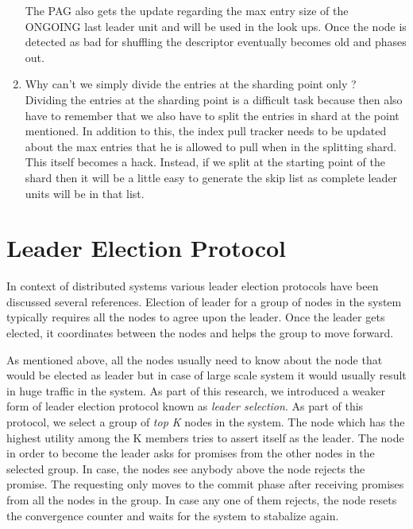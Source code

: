 \documentclass[a4paper, 11pt]{article}
\begin{document}
\begin{enumerate}
The PAG also gets the update regarding the max entry size of the ONGOING last leader unit and will be used in the look ups. Once the node is detected as bad for shuffling the descriptor eventually becomes old and phases out.


\item Why can't we simply divide the entries at the sharding point only ? \\
Dividing the entries at the sharding point is a difficult task because then also have to remember that we also have to split the entries in shard at the point mentioned. In addition to this, the index pull tracker needs to be updated about the max entries that he is allowed to pull when in the splitting shard. This itself becomes a hack. Instead, if we split at the starting point of the shard then it will be a little easy to generate the skip list as complete leader units will be in that list. 


\end{enumerate}

\newpage
\section{Leader Election Protocol}

In context of distributed systems various leader election protocols have been discussed {several references}. Election of leader for a group of nodes in the system typically requires all the nodes to agree upon the leader. Once the leader gets elected, it coordinates between the nodes and helps the group to move forward. 
\par As mentioned above, all the nodes usually need to know about the node that would be elected as leader but in case of large scale system it would usually result in huge traffic in the system. As part of this research, we introduced a weaker form of leader election protocol known as \textit{leader selection}. As part of this protocol, we select a group of \textit{top K} nodes in the system. The node which has the highest utility among the K members tries to assert itself as the leader. The node in order to become the leader asks for promises from the other nodes in the selected group. In case, the nodes see anybody above the node rejects the promise. The requesting only moves to the commit phase after receiving promises from all the nodes in the group. In case any one of them rejects, the node resets the convergence counter and waits for the system to stabalize again. 
\end{document}
